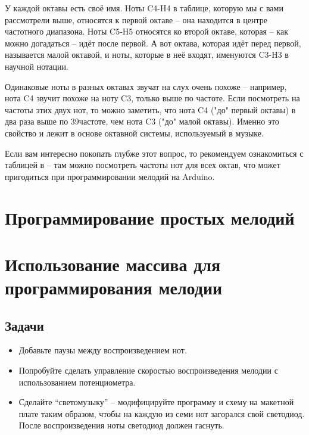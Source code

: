\documentclass[a4paper,twoside]{book}
\begin{document}
У каждой октавы есть своё имя. Ноты C4-H4 в таблице, которую мы с вами
рассмотрели выше, относятся к первой октаве -- она находится в центре частотного
диапазона. Ноты C5-H5 относятся ко второй октаве, которая -- как можно догадаться
-- идёт после первой. А вот октава, которая идёт перед первой, называется малой
октавой, и ноты, которые в неё входят, именуются C3-H3 в научной нотации.

Одинаковые ноты в разных октавах звучат на слух очень похоже -- например, нота C4
звучит похоже на ноту C3, только выше по частоте. Если посмотреть на частоты этих
двух нот, то можно заметить, что нота C4 ("до" первый октавы) в два раза выше по
39частоте, чем нота C3 ("до" малой октавы). Именно это свойство и лежит в основе
октавной системы, используемый в музыке.

Если вам интересно покопать глубже этот вопрос, то рекомендуем ознакомиться с
таблицей в  -- там можно посмотреть частоты нот для
всех октав, что может пригодиться при программировании мелодий на Arduino.

\section{Программирование простых мелодий}

\section{Использование массива для программирования мелодии}

\subsection{Задачи}
\begin{itemize}
\item Добавьте паузы между воспроизведением нот.
\item Попробуйте сделать управление скоростью воспроизведения мелодии с
  использованием потенциометра.
\item Сделайте ``светомузыку'' -- модифицируйте программу и схему на макетной плате
  таким образом, чтобы на каждую из семи нот загорался свой светодиод. После
  воспроизведения ноты светодиод должен гаснуть.
\end{itemize}
\end{document}
